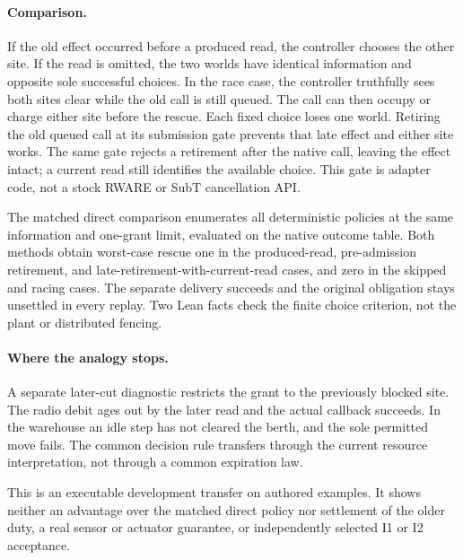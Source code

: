 \documentclass{article}
\begin{document}
\paragraph{Comparison.}
If the old effect occurred before a produced read, the controller
chooses the other site. If the read is omitted, the two worlds
have identical information and opposite sole successful choices.
In the race case, the controller truthfully sees both sites clear
while the old call is still queued. The call can then occupy or
charge either site before the rescue. Each fixed choice loses one
world. Retiring the old queued call at its submission gate prevents
that late effect and either site works. The same gate rejects a
retirement after the native call, leaving the effect intact; a
current read still identifies the available choice. This gate is
adapter code, not a stock RWARE or SubT cancellation API.

The matched direct comparison enumerates all deterministic policies
at the same information and one-grant limit, evaluated on the
native outcome table. Both methods obtain worst-case rescue one
in the produced-read, pre-admission retirement, and
late-retirement-with-current-read cases, and zero in the skipped
and racing cases. The separate delivery succeeds and the original
obligation stays unsettled in every replay. Two Lean facts check
the finite choice criterion, not the plant or distributed fencing.

\paragraph{Where the analogy stops.}
A separate later-cut diagnostic restricts the grant to the
previously blocked site. The radio debit ages out by the later
read and the actual callback succeeds. In the warehouse an idle
step has not cleared the berth, and the sole permitted move fails.
The common decision rule transfers through the current resource
interpretation, not through a common expiration law.

This is an executable development transfer on authored examples.
It shows neither an advantage over the matched direct policy nor
settlement of the older duty, a real sensor or actuator guarantee,
or independently selected I1 or I2 acceptance.
\end{document}
